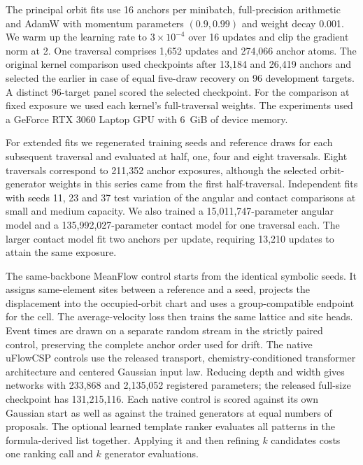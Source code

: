 The principal orbit fits use 16 anchors per minibatch, full-precision arithmetic and AdamW with momentum parameters $(0.9,0.99)$ and weight decay 0.001. We warm up the learning rate to $3\times 10^{-4}$ over 16 updates and clip the gradient norm at 2. One traversal comprises 1,652 updates and 274,066 anchor atoms. The original kernel comparison used checkpoints after 13,184 and 26,419 anchors and selected the earlier in case of equal five-draw recovery on 96 development targets. A distinct 96-target panel scored the selected checkpoint. For the comparison at fixed exposure we used each kernel's full-traversal weights. The experiments used a GeForce RTX 3060 Laptop GPU with 6~GiB of device memory.

For extended fits we regenerated training seeds and reference draws for each subsequent traversal and evaluated at half, one, four and eight traversals. Eight traversals correspond to 211,352 anchor exposures, although the selected orbit-generator weights in this series came from the first half-traversal. Independent fits with seeds 11, 23 and 37 test variation of the angular and contact comparisons at small and medium capacity. We also trained a 15,011,747-parameter angular model and a 135,992,027-parameter contact model for one traversal each. The larger contact model fit two anchors per update, requiring 13,210 updates to attain the same exposure.

The same-backbone MeanFlow control starts from the identical symbolic seeds. It assigns same-element sites between a reference and a seed, projects the displacement into the occupied-orbit chart and uses a group-compatible endpoint for the cell. The average-velocity loss then trains the same lattice and site heads. Event times are drawn on a separate random stream in the strictly paired control, preserving the complete anchor order used for drift. The native uFlowCSP controls use the released transport, chemistry-conditioned transformer architecture and centered Gaussian input law. Reducing depth and width gives networks with 233,868 and 2,135,052 registered parameters; the released full-size checkpoint has 131,215,116. Each native control is scored against its own Gaussian start as well as against the trained generators at equal numbers of proposals. The optional learned template ranker evaluates all patterns in the formula-derived list together. Applying it and then refining $k$ candidates costs one ranking call and $k$ generator evaluations.

